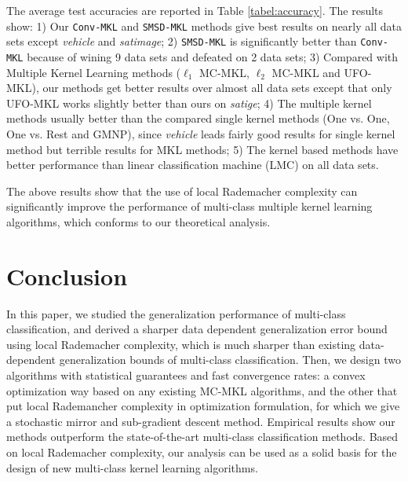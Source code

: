 \documentclass{article}
\begin{document}
The average test accuracies are reported in Table \ref{tabel:accuracy}.
The results show: 1) Our \texttt{Conv-MKL} and \texttt{SMSD-MKL} methods give best results on nearly all data sets
except \textit{vehicle} and \textit{satimage};
2) \texttt{SMSD-MKL} is significantly better than \texttt{Conv-MKL} because of wining 9 data sets and defeated on 2 data sets;
3) Compared with Multiple Kernel Learning methods ($\ell_1$ MC-MKL, $\ell_2$ MC-MKL and UFO-MKL),
our methods get better results over almost all data sets except that only UFO-MKL works slightly better than ours on \textit{satige};
4) The multiple kernel methods usually better than the compared single kernel methods (One vs. One, One vs. Rest and GMNP),
since \textit{vehicle} leads fairly good results for single kernel method but terrible results for MKL methods;
5) The kernel based methods have better performance than linear classification machine (LMC) on all data sets.

The above results show that the use of local Rademacher complexity can significantly improve
the performance of multi-class multiple kernel learning algorithms,
which conforms to our theoretical analysis.
\section{Conclusion}
In this paper, we studied the generalization performance of multi-class classification,
and derived a sharper data dependent generalization error bound using local Rademacher complexity,
which is much sharper than existing data-dependent generalization bounds of multi-class classification.
Then, we design two algorithms with statistical guarantees and fast convergence rates:
a convex optimization way based on any existing MC-MKL algorithms,
and the other that put local Rademancher complexity in optimization formulation,
for which we give a stochastic mirror and sub-gradient descent method.
Empirical results show our methods outperform the state-of-the-art multi-class classification methods.
Based on local Rademacher complexity, our analysis can be used as a solid basis for the
design of new multi-class kernel learning algorithms.




\end{document}
